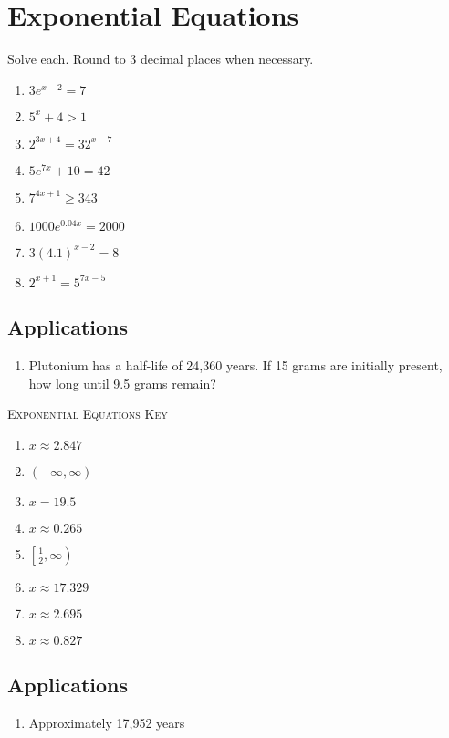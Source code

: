 \chapter{Exponential Equations}

Solve each. Round to 3 decimal places when necessary.
\begin{enumerate}
	\item $3e^{x-2} = 7$
	\item $5^x + 4 > 1$
	\item $2^{3x+4} = 32^{x-7}$
	\item $5e^{7x} + 10 = 42$
	\item $7^{4x+1} \geq 343$
	\item $1000e^{0.04x} = 2000$
	\item $3(4.1)^{x-2} = 8$
	\item $2^{x+1} = 5^{7x-5}$
\end{enumerate}

\section{Applications}
\begin{enumerate}
	\item Plutonium has a half-life of 24,360 years. If 15 grams are initially present, how long until 9.5 grams remain?
\end{enumerate}

\newpage

\textsc{Exponential Equations Key}

\begin{enumerate}
	\item $x \approx 2.847$
	\item $(-\infty, \infty)$
	\item $x = 19.5$
	\item $x \approx 0.265$
	\item $\left[\frac{1}{2}, \infty\right)$
	\item $x \approx 17.329$
	\item $x \approx 2.695$
    \item $x \approx 0.827$
\end{enumerate}

\section*{Applications}

\begin{enumerate}
	\item Approximately 17,952 years
\end{enumerate}